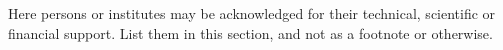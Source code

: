 \documentclass[10pt]{imeko_acta}
\begin{document}
Here persons or institutes may be acknowledged for their technical, scientific or financial support. List them in this section, and not as a footnote or otherwise. 





%
%

\end{document}
